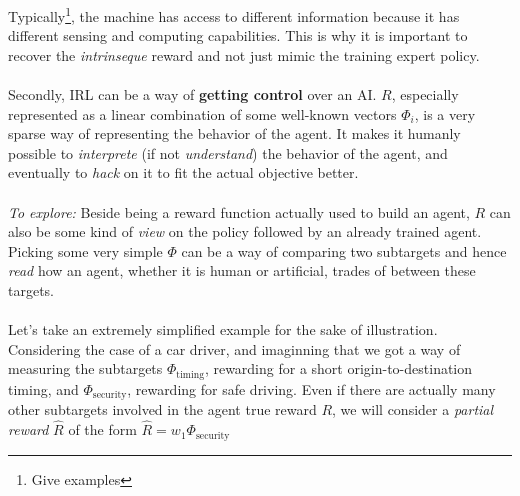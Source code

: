 \documentclass{article}
\begin{document}
Typically\footnote{Give examples}, the machine has access to different information because it has different sensing and computing capabilities. This is why it is important to recover the \emph{intrinseque} reward and not just mimic the training expert policy.

\paragraph{}
Secondly, IRL can be a way of \textbf{getting control} over an AI. $R$, especially represented as a linear combination of some well-known vectors $\Phi_i$, is a very sparse way of representing the behavior of the agent. It makes it humanly possible to \emph{interprete} (if not \emph{understand}) the behavior of the agent, and eventually to \emph{hack} on it to fit the actual objective better.

\paragraph{}
\emph{To explore:} Beside being a reward function actually used to build an agent, $R$ can also be some kind of \emph{view} on the policy followed by an already trained agent. Picking some very simple $\Phi$ can be a way of comparing two subtargets and hence \emph{read} how an agent, whether it is human or artificial, trades of between these targets.

\paragraph{}
Let's take an extremely simplified example for the sake of illustration. Considering the case of a car driver, and imaginning that we got a way of measuring the subtargets $\Phi_{\text{timing}}$, rewarding for a short origin-to-destination timing, and $\Phi_{\text{security}}$, rewarding for safe driving. Even if there are actually many other subtargets involved in the agent true reward $R$, we will consider a \emph{partial reward} $\hat R$ of the form $\hat R = w_1 \Phi_{\text{security}}$





\end{document}
